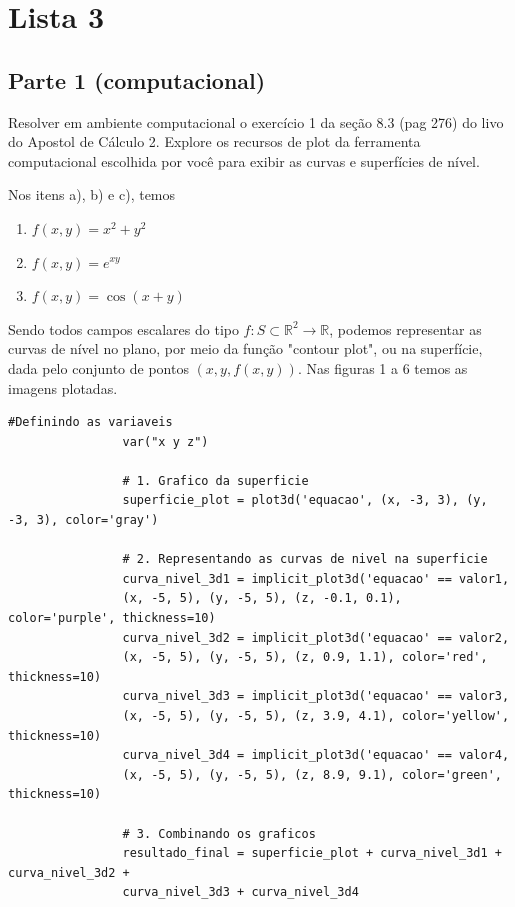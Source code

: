 \documentclass[../main.tex]{subfiles}
\begin{document}
	
	\section{Lista 3}
		\subsection{Parte 1 (computacional)}
		\begin{exercicio}{1}
			Resolver em ambiente computacional o exercício 1 da seção 8.3 (pag 276) do livo do Apostol de Cálculo 2. Explore os recursos de plot da ferramenta computacional escolhida por você para exibir as curvas e superfícies de nível.
		\end{exercicio}
		
		\begin{solucao}
			Nos itens a), b) e c), temos
			\begin{enumerate}[label=\alph*)]
				\item $f(x,y)=x^2+y^2$
				\item $f(x,y)=e^{xy}$
				\item $f(x,y)=\cos(x+y)$
			\end{enumerate}
			
			
			Sendo todos campos escalares do tipo $f:S\subset \mathbb{R}^2\rightarrow \mathbb{R}$, podemos representar as curvas de nível no plano, por meio da função "contour plot", ou na superfície, dada pelo conjunto de pontos $(x,y,f(x,y))$. Nas figuras 1 a 6 temos as imagens plotadas.
			
			\begin{lstlisting}[style=python_estiloso, caption={estrutura do código da questão 1, itens a), b), c)}]
				#Definindo as variaveis
				var("x y z")
				
				# 1. Grafico da superficie
				superficie_plot = plot3d('equacao', (x, -3, 3), (y, -3, 3), color='gray')
				
				# 2. Representando as curvas de nivel na superficie
				curva_nivel_3d1 = implicit_plot3d('equacao' == valor1,
				(x, -5, 5), (y, -5, 5), (z, -0.1, 0.1), color='purple', thickness=10)
				curva_nivel_3d2 = implicit_plot3d('equacao' == valor2,
				(x, -5, 5), (y, -5, 5), (z, 0.9, 1.1), color='red', thickness=10)
				curva_nivel_3d3 = implicit_plot3d('equacao' == valor3,
				(x, -5, 5), (y, -5, 5), (z, 3.9, 4.1), color='yellow', thickness=10)
				curva_nivel_3d4 = implicit_plot3d('equacao' == valor4,
				(x, -5, 5), (y, -5, 5), (z, 8.9, 9.1), color='green', thickness=10)
				
				# 3. Combinando os graficos
				resultado_final = superficie_plot + curva_nivel_3d1 + curva_nivel_3d2 + 
				curva_nivel_3d3 + curva_nivel_3d4
				

\end{lstlisting}
\end{solucao}
\end{document}
